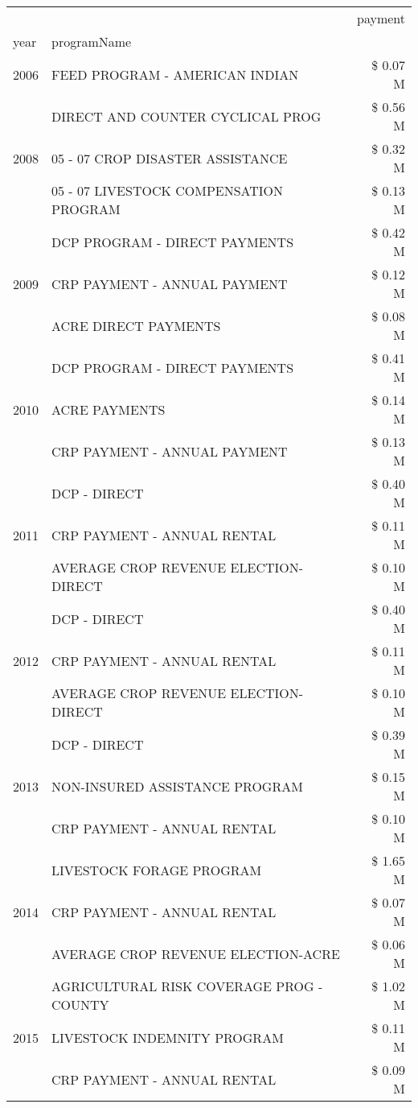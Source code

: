 \begin{tabular}{llr}
\toprule
 &  & payment \\
year & programName &  \\
\midrule
2006 & FEED PROGRAM - AMERICAN INDIAN & \$ 0.07 M \\
\cline{1-3}
\multirow[t]{3}{*}{2008} & DIRECT AND COUNTER CYCLICAL PROG & \$ 0.56 M \\
 & 05 - 07 CROP DISASTER ASSISTANCE & \$ 0.32 M \\
 & 05 - 07 LIVESTOCK COMPENSATION PROGRAM & \$ 0.13 M \\
\cline{1-3}
\multirow[t]{3}{*}{2009} & DCP PROGRAM - DIRECT PAYMENTS & \$ 0.42 M \\
 & CRP PAYMENT - ANNUAL PAYMENT & \$ 0.12 M \\
 & ACRE DIRECT PAYMENTS & \$ 0.08 M \\
\cline{1-3}
\multirow[t]{3}{*}{2010} & DCP PROGRAM - DIRECT PAYMENTS & \$ 0.41 M \\
 & ACRE PAYMENTS & \$ 0.14 M \\
 & CRP PAYMENT - ANNUAL PAYMENT & \$ 0.13 M \\
\cline{1-3}
\multirow[t]{3}{*}{2011} & DCP - DIRECT & \$ 0.40 M \\
 & CRP PAYMENT - ANNUAL RENTAL & \$ 0.11 M \\
 & AVERAGE CROP REVENUE ELECTION-DIRECT & \$ 0.10 M \\
\cline{1-3}
\multirow[t]{3}{*}{2012} & DCP - DIRECT & \$ 0.40 M \\
 & CRP PAYMENT - ANNUAL RENTAL & \$ 0.11 M \\
 & AVERAGE CROP REVENUE ELECTION-DIRECT & \$ 0.10 M \\
\cline{1-3}
\multirow[t]{3}{*}{2013} & DCP - DIRECT & \$ 0.39 M \\
 & NON-INSURED ASSISTANCE PROGRAM & \$ 0.15 M \\
 & CRP PAYMENT - ANNUAL RENTAL & \$ 0.10 M \\
\cline{1-3}
\multirow[t]{3}{*}{2014} & LIVESTOCK FORAGE PROGRAM & \$ 1.65 M \\
 & CRP PAYMENT - ANNUAL RENTAL & \$ 0.07 M \\
 & AVERAGE CROP REVENUE ELECTION-ACRE & \$ 0.06 M \\
\cline{1-3}
\multirow[t]{3}{*}{2015} & AGRICULTURAL RISK COVERAGE PROG - COUNTY & \$ 1.02 M \\
 & LIVESTOCK INDEMNITY PROGRAM & \$ 0.11 M \\
 & CRP PAYMENT - ANNUAL RENTAL & \$ 0.09 M \\

\end{tabular}

